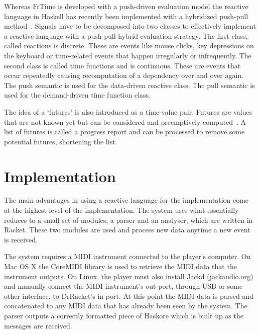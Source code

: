 \documentclass[12pt]{ucthesis}
\begin{document}
Whereas FrTime is developed with a push-driven evaluation model the reactive language in Haskell has recently been implemented with a hybridized push-pull method~\cite{push-pull-frp}.  Signals have to be decomposed into two classes to effectively implement a reactive language with a push-pull hybrid evaluation strategy. The first class, called reactions is discrete. These are events like mouse clicks, key depressions on the keyboard or time-related events that happen irregularly or infrequently. The second class is called time functions and is continuous. These are events that occur repeatedly causing recomputation of a dependency over and over again. The push semantic is used for the data-driven reactive class. The pull semantic is used for the demand-driven time function class.


The idea of a `futures' is also introduced as a time-value pair. Futures are values that are not known yet but can be considered and preemptively computed~\cite{push-pull-frp}. A list of futures is called a progress report and can be processed to remove some potential futures, shortening the list.  

\chapter{Implementation}
\label{Implementation}
The main advantages in using a reactive language for the implementation come at the highest level of the implementation. The system uses what essentially reduces to a small set of modules, a parser and an analyser, which are written in Racket. These two modules are used and process new data anytime a new event is received. 

The system requires a MIDI instrument connected to the player's computer. On Mac OS X the CoreMIDI library is used to retrieve the MIDI data that the instrument outputs. On Linux, the player must also install Jackd (jackaudio.org) and manually connect the MIDI instrument's out port, through USB or some other interface, to DrRacket's in port. At this point the MIDI data is parsed and concatenated to any MIDI data that has already been seen by the system. The parser outputs a correctly formatted piece of Haskore which is built up as the messages are received. 

\end{document}
